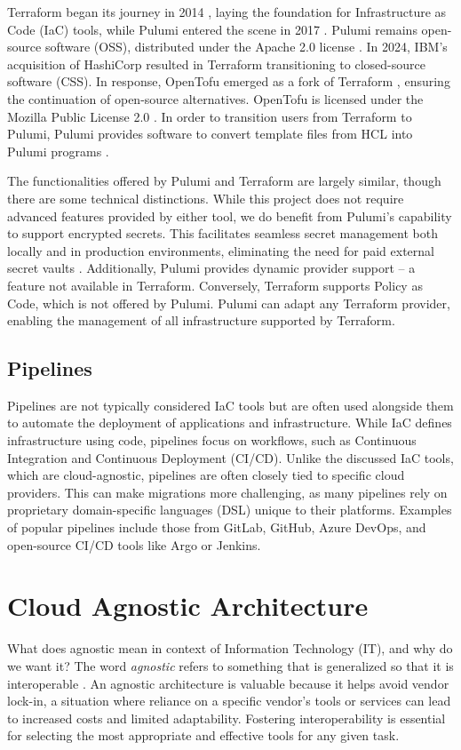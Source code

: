 Terraform began its journey in 2014 \Parencite{hashicorpTerraform}, laying the foundation for Infrastructure as Code (IaC) tools, while Pulumi entered the scene in 2017 \Parencite{pulumiAbout}. Pulumi remains open-source software (OSS), distributed under the Apache 2.0 license \Parencite{pulumiLicense2025}. In 2024, IBM's acquisition of HashiCorp resulted in Terraform transitioning to closed-source software (CSS). In response, OpenTofu emerged as a fork of Terraform \Parencite{opentofu}, ensuring the continuation of open-source alternatives. OpenTofu is licensed under the Mozilla Public License 2.0 \Parencite{opentofuLicense2025}. In order to transition users from Terraform to Pulumi, Pulumi provides software to convert template files from HCL into Pulumi programs \Parencite{pulumiMigration2025}.

The functionalities offered by Pulumi and Terraform are largely similar, though there are some technical distinctions. While this project does not require advanced features provided by either tool, we do benefit from Pulumi's capability to support encrypted secrets. This facilitates seamless secret management both locally and in production environments, eliminating the need for paid external secret vaults \Parencite{pulumi_vs_terraform}. Additionally, Pulumi provides dynamic provider support -- a feature not available in Terraform. Conversely, Terraform supports Policy as Code, which is not offered by Pulumi. Pulumi can adapt any Terraform provider, enabling the management of all infrastructure supported by Terraform.

\subsection{Pipelines}
Pipelines are not typically considered IaC tools but are often used alongside them to automate the deployment of applications and infrastructure. While IaC defines infrastructure using code, pipelines focus on workflows, such as Continuous Integration and Continuous Deployment (CI/CD). Unlike the discussed IaC tools, which are cloud-agnostic, pipelines are often closely tied to specific cloud providers. This can make migrations more challenging, as many pipelines rely on proprietary domain-specific languages (DSL) unique to their platforms. Examples of popular pipelines include those from GitLab, GitHub, Azure DevOps, and open-source CI/CD tools like Argo or Jenkins.

\section{Cloud Agnostic Architecture}
What does agnostic mean in context of Information Technology (IT), and why do we want it? The word \textit{agnostic} refers to something that is generalized so that it is interoperable \Parencite{techtarget_agnostic_definition}. An agnostic architecture is valuable because it helps avoid vendor lock-in, a situation where reliance on a specific vendor's tools or services can lead to increased costs and limited adaptability. Fostering interoperability is essential for selecting the most appropriate and effective tools for any given task.

